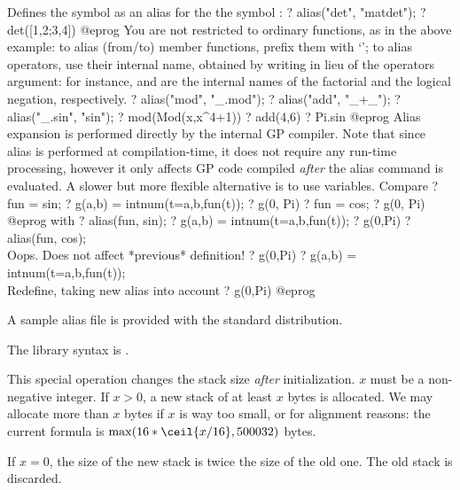 \label{se:alias}
Defines the symbol  as an alias for the the symbol :
\bprog
? alias("det", "matdet");
? det([1,2;3,4])
@eprog\noindent
You are not restricted to ordinary functions, as in the above example:
to alias (from/to) member functions, prefix them with `';
to alias operators, use their internal name, obtained by writing
\kbd{\_} in lieu of the operators argument: for instance, \kbd{\_!} and
\kbd{!\_} are the internal names of the factorial and the
logical negation, respectively.
\bprog
? alias("mod", "_.mod");
? alias("add", "_+_");
? alias("_.sin", "sin");
? mod(Mod(x,x^4+1))
? add(4,6)
? Pi.sin
@eprog
Alias expansion is performed directly by the internal GP compiler.
Note that since alias is performed at compilation-time, it does not
require any run-time processing, however it only affects GP code
compiled \emph{after} the alias command is evaluated. A slower but more
flexible alternative is to use variables. Compare
\bprog
? fun = sin;
? g(a,b) = intnum(t=a,b,fun(t));
? g(0, Pi)
? fun = cos;
? g(0, Pi)
@eprog\noindent
with
\bprog
? alias(fun, sin);
? g(a,b) = intnum(t=a,b,fun(t));
? g(0,Pi)
? alias(fun, cos);  \\ Oops. Does not affect *previous* definition!
? g(0,Pi)
? g(a,b) = intnum(t=a,b,fun(t)); \\ Redefine, taking new alias into account
? g(0,Pi)
@eprog

A sample alias file  is provided with
the standard distribution.

The library syntax is .

\label{se:allocatemem}
This special operation changes the stack size \emph{after}
initialization. $x$ must be a non-negative integer. If $x > 0$, a new stack
of at least $x$ bytes is allocated. We may allocate more than $x$ bytes if
$x$ is way too small, or for alignment reasons: the current formula is
$\max(16*\ceil{x/16}, 500032)$ bytes.

If $x=0$, the size of the new stack is twice the size of the old one. The
old stack is discarded.

